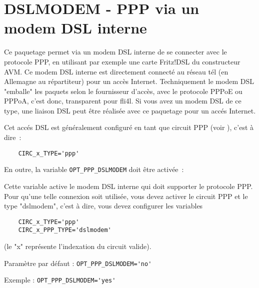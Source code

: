 
\section{DSLMODEM - PPP via un modem DSL interne}

Ce paquetage permet via un modem DSL interne de se connecter avec le protocole
PPP, en utilisant par exemple une carte Fritz!DSL du constructeur AVM. Ce modem
DSL interne est directement connecté au réseau tél (en Allemagne au répartiteur)
pour un accès Internet. Techniquement le modem DSL "emballe" les paquets selon
le fournisseur d'accès, avec le protocole PPPoE ou PPPoA, c'est donc, transparent
pour fli4l. Si vous avez un modem DSL de ce type, une liaison DSL peut être réalisée
avec ce paquetage pour un accés Internet.

Cet accés DSL est généralement configuré en tant que circuit PPP (voir
), c'est à dire~:

\begin{example}
\begin{verbatim}
    CIRC_x_TYPE='ppp'
\end{verbatim}
\end{example}

En outre, la variable \verb+OPT_PPP_DSLMODEM+ doit être activée~:

\begin{description}

Cette variable active le modem DSL interne qui doit supporter le protocole
PPP. Pour qu'une telle connexion soit utilisée, vous devez activer le circuit
PPP et le type "dslmodem", c'est à dire, vous devez configurer les variables

\begin{example}
\begin{verbatim}
    CIRC_x_TYPE='ppp'
    CIRC_x_PPP_TYPE='dslmodem'
\end{verbatim}
\end{example}

(le "x" représente l'indexation du circuit valide).

Paramètre par défaut : \verb+OPT_PPP_DSLMODEM='no'+

Exemple : \verb+OPT_PPP_DSLMODEM='yes'+
\end{description}


